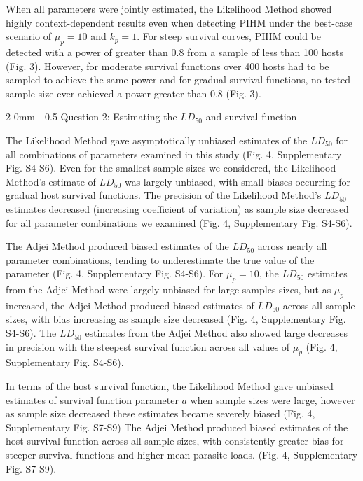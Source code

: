 \documentclass[12pt, a4paper]{article}
\makeatletter
\renewcommand{\subsection}{\@startsection
{subsection}%
{2}%
{0mm}%
{-\baselineskip}%
{0.5\baselineskip}%
{\normalfont\bf}} %
\makeatother
\begin{document}
When all parameters were jointly estimated, the Likelihood Method showed highly
context-dependent results even when detecting PIHM under the best-case scenario of
$\mu_p = 10$ and $k_p = 1$. For steep survival curves, PIHM could be detected with a power of greater than 0.8 from a sample of less than 100 hosts (Fig. 3). However, for moderate survival functions over 400 hosts had to be sampled to achieve the same power and for gradual survival functions, no tested sample size ever achieved a power greater than 0.8 (Fig. 3).

\subsection{Question 2: Estimating the $LD_{50}$ and survival function}

The Likelihood Method gave asymptotically unbiased estimates of the $LD_{50}$
for all combinations of parameters examined in this study (Fig. 4, Supplementary Fig. S4-S6).  Even for
the smallest sample sizes we considered, the Likelihood Method's estimate of $LD_{50}$
was largely unbiased, with small biases occurring for gradual host survival functions. The precision of the Likelihood Method's $LD_{50}$ estimates decreased
(increasing coefficient of variation) as sample size decreased for all
parameter combinations we examined (Fig. 4, Supplementary Fig. S4-S6).

The Adjei Method produced biased estimates of the $LD_{50}$ across nearly all parameter combinations, tending to underestimate the true value of the parameter (Fig. 4, Supplementary Fig. S4-S6).  For $\mu_p = 10$, the $LD_{50}$
estimates from the Adjei Method were largely unbiased for large samples sizes, but as $\mu_p$ increased, the Adjei Method
produced biased estimates of $LD_{50}$ across all sample sizes, with bias
increasing as sample size decreased (Fig. 4, Supplementary Fig. S4-S6). The $LD_{50}$ estimates from the Adjei
Method also showed large decreases in precision with the steepest survival function across all values of $\mu_p$ (Fig. 4, Supplementary Fig. S4-S6).

In terms of the host survival function, the Likelihood Method gave unbiased estimates of survival function parameter $a$ when sample sizes were large, however as sample size decreased these estimates became severely biased (Fig. 4, Supplementary Fig. S7-S9) The Adjei Method produced
biased estimates of the host survival function across all sample sizes, with consistently greater bias for steeper survival functions and higher mean parasite loads. (Fig. 4, Supplementary Fig. S7-S9).
\end{document}

